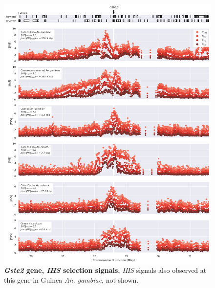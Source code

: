 \documentclass[a4paper,11pt,abstracton,hidelinks]{scrartcl}
\begin{document}
\begin{figure}[t!]
	\begin{center}
		\includegraphics*[width=1.1\linewidth,center]{artwork/locus_gste2_ihs.png}
	\end{center}
	\caption[\textit{Gste2} gene, \textit{IHS} selection signals]{
	\textbf{\textit{Gste2} gene, \textit{IHS} selection signals.}
	\textit{IHS} signals also observed at this gene in Guinea \textit{An. gambiae}, not shown. 
	} 
	\label{fig:locus_gste2_ihs}
\end{figure}


\clearpage
\end{document}
